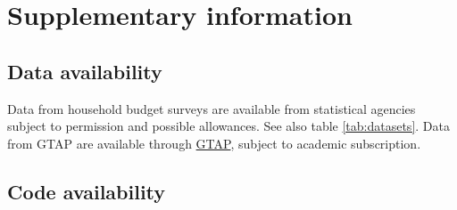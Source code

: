 \documentclass[12pt, a4paper]{article}
\begin{document}
\begin{refsection}

\clearpage


\clearpage


\clearpage


\clearpage


\clearpage


\clearpage


\clearpage


\clearpage


\clearpage

\begin{refcontext}[sorting=nyt]
\printbibliography[heading=subbibliography, title ={References (Appendix)}]
\end{refcontext}
\end{refsection}

\clearpage

\section{Supplementary information}

\subsection{Data availability} \label{data_availability} Data from household budget surveys are available from statistical agencies subject to permission and possible allowances. See also table \ref{tab:datasets}. Data from GTAP are available through \href{https://www.gtap.agecon.purdue.edu/}{GTAP}, subject to academic subscription.  

\subsection{Code availability} \label{code}
\end{document}
